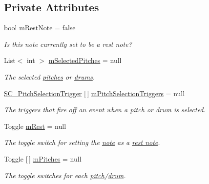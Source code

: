 \subsection*{Private Attributes}
\begin{DoxyCompactItemize}
\item 
bool \hyperlink{group___s_c___p_s_c_priv_var_ga6eec175f775c35e2d0eb51dfe6def49f}{m\+Rest\+Note} = false
\begin{DoxyCompactList}\small\item\em Is this note currently set to be a rest note? \end{DoxyCompactList}\item 
List$<$ int $>$ \hyperlink{group___s_c___p_s_c_priv_var_ga5a8a5c31158f6af7f0c17d4fd03c5641}{m\+Selected\+Pitches} = null
\begin{DoxyCompactList}\small\item\em The selected \hyperlink{group___music_enums_ga508f69b199ea518f935486c990edac1d}{pitches} or \hyperlink{group___music_enums_gade475b4382c7066d1af13e7c13c029b6}{drums}. \end{DoxyCompactList}\item 
\hyperlink{class_s_c___pitch_selection_trigger}{S\+C\+\_\+\+Pitch\+Selection\+Trigger} \mbox{[}$\,$\mbox{]} \hyperlink{group___s_c___p_s_c_priv_var_ga8431846d376b98bc6de5a872cce2c596}{m\+Pitch\+Selection\+Triggers} = null
\begin{DoxyCompactList}\small\item\em The \hyperlink{group___doc_s_c___p_s_t}{triggers} that fire off an event when a \hyperlink{group___music_enums_ga508f69b199ea518f935486c990edac1d}{pitch} or \hyperlink{group___music_enums_gade475b4382c7066d1af13e7c13c029b6}{drum} is selected. \end{DoxyCompactList}\item 
Toggle \hyperlink{group___s_c___p_s_c_priv_var_gae4378d4e0b53501eb0f55b8af38a5a8c}{m\+Rest} = null
\begin{DoxyCompactList}\small\item\em The toggle switch for setting the \hyperlink{group___music_structs_struct_music_1_1_combined_note}{note} as a \hyperlink{group___doc_s_c___p_s_c_DocSC_PSCRest}{rest note}. \end{DoxyCompactList}\item 
Toggle \mbox{[}$\,$\mbox{]} \hyperlink{group___s_c___p_s_c_priv_var_ga25180add92621da773b024083d3a61af}{m\+Pitches} = null
\begin{DoxyCompactList}\small\item\em The toggle switches for each \hyperlink{group___music_enums_ga508f69b199ea518f935486c990edac1d}{pitch}/\hyperlink{group___music_enums_gade475b4382c7066d1af13e7c13c029b6}{drum}. \end{DoxyCompactList}\end{DoxyCompactItemize}



